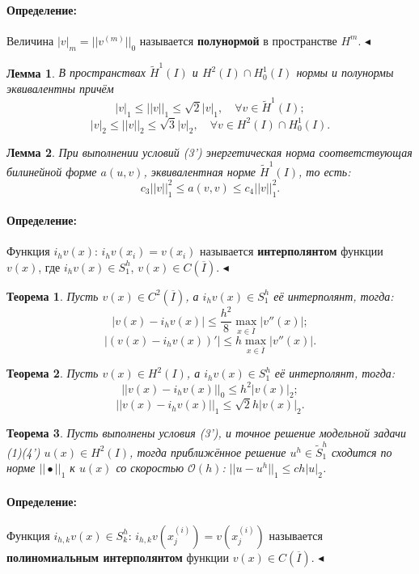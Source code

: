 \documentclass{article}
\newtheorem{theorem}{Теорема}
\newtheorem{lemma}{Лемма}
\newenvironment{definition}{ \paragraph{Определение:}}{\hfill $\blacktriangleleft$}
\begin{document}
\begin{definition}
	Величина $|v|_m = ||v^{(m)}||_0$ называется \textbf{полунормой} в пространстве $H^m$.
\end{definition}

\begin{lemma}
	В пространствах $\tilde{H}^1(I)$ и $H^2(I) \cap H_0^1(I)$ нормы и полунормы эквивалентны причём
	\[
	|v|_1 \leqslant ||v||_1 \leqslant \sqrt{2} |v|_1, \quad \forall v \in \tilde{H}^1(I);	
	\]
	\[
	|v|_2 \leqslant ||v||_2 \leqslant \sqrt{3} |v|_2, \quad \forall v \in H^2(I) \cap H_0^1(I).
	\]
\end{lemma}

\begin{lemma}
	При выполнении условий (3') энергетическая норма соответствующая билинейной форме $a(u,v)$, эквивалентная норме $\tilde{H}^1(I)$, то есть:
	\[
	c_3 ||v||_1^2 \leqslant a(v,v) \leqslant c_4 ||v||_1^2. 	
	\]
\end{lemma}

\begin{definition}
	Функция $i_h v(x)$: $i_h v(x_i)= v(x_i)$ называется \textbf{интерполянтом} функции $v(x)$, где $i_h v(x) \in S_1^h$, $v(x) \in C(\overline{I})$.
\end{definition}

\begin{theorem}
	Пусть $v(x) \in C^2(\overline{I})$, а $i_h v(x) \in S_1^h$ её интерполянт, тогда:
	\[
	|v(x) - i_h v(x)| \leqslant \dfrac{h^2}{8} \max\limits_{x \in \overline{I}} |v''(x)|;	
	\]
	\[
	|(v(x) - i_h v(x))'| \leqslant h \max\limits_{x \in \overline{I}} |v''(x)|.
	\]
\end{theorem}

\begin{theorem}
	Пусть $v(x) \in H^2(I)$, а $i_h v(x) \in S_1^h$ её интерполянт, тогда:
	\[
	||v(x) - i_h v(x)||_0 \leqslant h^2 |v(x)|_2;	
	\]
	\[
	||v(x) - i_h v(x)||_1 \leqslant \sqrt{2}h |v(x)|_2.
	\]
\end{theorem}

\begin{theorem}
	Пусть выполнены условия (3'), и точное решение модельной задачи (1)(4') $u(x) \in H^2(I)$, тогда приближённое решение $u^h \in \tilde{S}_1^h$ сходится по норме $||\bullet||_1$ к $u(x)$ со скоростью $\mathcal{O}(h)$: $||u-u^h||_1 \leqslant c h |u|_2$.
\end{theorem}

\begin{definition}
	Функция $i_{h,k} v(x) \in S_k^h$: $i_{h,k} v(x_j^{(i)})= v(x_j^{(i)})$ называется \textbf{полиномиальным интерполянтом} функции $v(x) \in C(\overline{I})$.
\end{definition}
\end{document}
